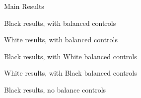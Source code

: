\documentclass{article}
\begin{document}
\begin{table}[htbp]\centering {}  \begin{threeparttable} \caption{Main Results}
\footnotesize

\end{threeparttable}  \end{table}
\clearpage


\begin{table}[htbp]\centering {}  \begin{threeparttable} \caption{Black results, with balanced controls}
\footnotesize

\end{threeparttable}  \end{table}
\clearpage

\begin{table}[htbp]\centering {}  \begin{threeparttable} \caption{White results, with balanced controls}
\footnotesize

\end{threeparttable}  \end{table}
\clearpage


\begin{table}[htbp]\centering {}  \begin{threeparttable} \caption{Black results, with White balanced controls}
\footnotesize

\end{threeparttable}  \end{table}
\clearpage

\begin{table}[htbp]\centering {}  \begin{threeparttable} \caption{White results, with Black balanced controls}
\footnotesize

\end{threeparttable}  \end{table}
\clearpage


\begin{table}[htbp]\centering {}  \begin{threeparttable} \caption{Black results, no balance controls}
\footnotesize

\end{threeparttable}  \end{table}
\clearpage
\end{document}
